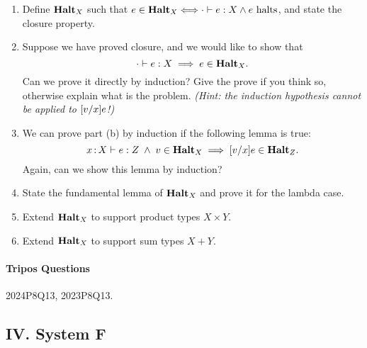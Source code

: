 \documentclass[11pt,a4paper,twoside]{article}
\begin{document}
\begin{enumerate}[label=(\alph*)]
  \item Define $\textbf{Halt}_X$ such that 
    $e \in \textbf{Halt}_X \Longleftrightarrow \cdot \vdash e : X \wedge e\text{ halts}$,  
  and state the closure property.

  \item Suppose we have proved closure, and we would like to show that
    \[ \cdot \vdash e : X \;\Longrightarrow\; e \in \textbf{Halt}_X. \]
  Can we prove it directly by induction? 
  Give the prove if you think so, otherwise explain what is the problem.
  \emph{(Hint: the induction hypothesis cannot be applied to $[v / x] e$!)}

  \item We can prove part (b) by induction if the following lemma is true:
    \[ 
      x \,{:}\, X \vdash e : Z \;\wedge\; 
      v \in \textbf{Halt}_X \;\Longrightarrow\; 
      [v / x] e \in \textbf{Halt}_Z. 
    \]
  Again, can we show this lemma by induction?

  \item State the fundamental lemma of $\textbf{Halt}_X$ and prove it for the lambda case.

  \item Extend $\textbf{Halt}_X$ to support product types $X \times Y$.
  
  \item Extend $\textbf{Halt}_X$ to support sum types $X + Y$.
\end{enumerate}

\paragraph{Tripos Questions} 2024P8Q13, 2023P8Q13.

\subsection*{IV. System F}

\end{document}
